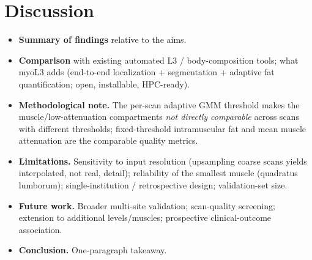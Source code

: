 \documentclass{article}
\begin{document}
\section{Discussion}
\begin{itemize}
  \item \textbf{Summary of findings} relative to the aims.
  \item \textbf{Comparison} with existing automated L3 / body-composition tools;
        what myoL3 adds (end-to-end localization + segmentation + adaptive fat
        quantification; open, installable, HPC-ready).
  \item \textbf{Methodological note.} The per-scan adaptive GMM threshold makes
        the muscle/low-attenuation compartments \emph{not directly comparable}
        across scans with different thresholds; fixed-threshold intramuscular
        fat and mean muscle attenuation are the comparable quality metrics.
  \item \textbf{Limitations.} Sensitivity to input resolution (upsampling coarse
        scans yields interpolated, not real, detail); reliability of the
        smallest muscle (quadratus lumborum); single-institution / retrospective
        design; validation-set size.
  \item \textbf{Future work.} Broader multi-site validation; scan-quality
        screening; extension to additional levels/muscles; prospective
        clinical-outcome association.
  \item \textbf{Conclusion.} One-paragraph takeaway.
\end{itemize}

\end{document}
